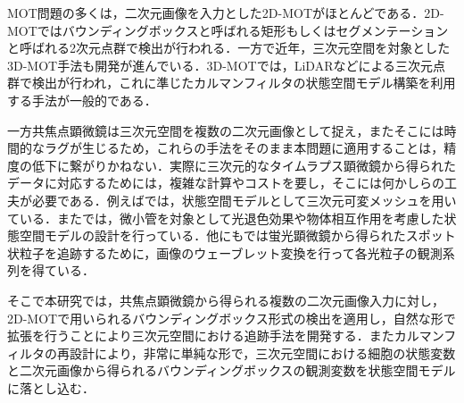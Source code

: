 MOT問題の多くは，二次元画像を入力とした2D-MOTがほとんどである．2D-MOTではバウンディングボックスと呼ばれる矩形もしくはセグメンテーションと呼ばれる2次元点群で検出が行われる．一方で近年，三次元空間を対象とした3D-MOT手法も開発が進んでいる．3D-MOTでは，LiDARなどによる三次元点群で検出が行われ，これに準じたカルマンフィルタの状態空間モデル構築を利用する手法が一般的である\cite{wang2023camo,wang2022deepfusionmot}．

一方共焦点顕微鏡は三次元空間を複数の二次元画像として捉え，またそこには時間的なラグが生じるため，これらの手法をそのまま本問題に適用することは，精度の低下に繋がりかねない．実際に三次元的なタイムラプス顕微鏡から得られたデータに対応するためには，複雑な計算やコストを要し，そこには何かしらの工夫が必要である．例えば\cite{5676210}では，状態空間モデルとして三次元可変メッシュを用いている．また\cite{smal2008particle}では，微小管を対象として光退色効果や物体相互作用を考慮した状態空間モデルの設計を行っている．他にも\cite{1621229}では蛍光顕微鏡から得られたスポット状粒子を追跡するために，画像のウェーブレット変換を行って各光粒子の観測系列を得ている．

そこで本研究では，共焦点顕微鏡から得られる複数の二次元画像入力に対し，2D-MOTで用いられるバウンディングボックス形式の検出を適用し，自然な形で拡張を行うことにより三次元空間における追跡手法を開発する．またカルマンフィルタの再設計により，非常に単純な形で，三次元空間における細胞の状態変数と二次元画像から得られるバウンディングボックスの観測変数を状態空間モデルに落とし込む．